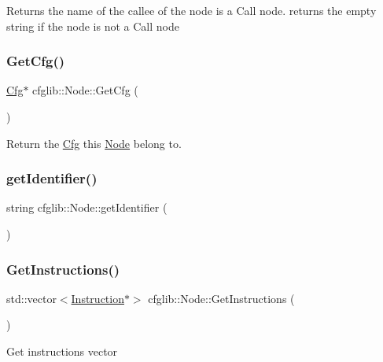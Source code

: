 Returns the name of the callee of the node is a Call node. returns the empty string if the node is not a Call node \mbox{\label{classcfglib_1_1Node_aba4169d7a66bceb6b5ae4e62193f669d}} 
\subsubsection{\texorpdfstring{Get\+Cfg()}{GetCfg()}}
{\footnotesize\ttfamily \hyperlink{classcfglib_1_1Cfg}{Cfg}$\ast$ cfglib\+::\+Node\+::\+Get\+Cfg (\begin{DoxyParamCaption}{ }\end{DoxyParamCaption})}

Return the \hyperlink{classcfglib_1_1Cfg}{Cfg} this \hyperlink{classcfglib_1_1Node}{Node} belong to. \mbox{\label{classcfglib_1_1Node_a42c979a43fa0e2314076fbecd3993514}} 
\subsubsection{\texorpdfstring{get\+Identifier()}{getIdentifier()}}
{\footnotesize\ttfamily string cfglib\+::\+Node\+::get\+Identifier (\begin{DoxyParamCaption}{ }\end{DoxyParamCaption})}

\mbox{\label{classcfglib_1_1Node_ad7e384556d7ab828b5e95536063668ad}} 
\subsubsection{\texorpdfstring{Get\+Instructions()}{GetInstructions()}}
{\footnotesize\ttfamily std\+::vector$<$\hyperlink{classcfglib_1_1Instruction}{Instruction}$\ast$$>$ cfglib\+::\+Node\+::\+Get\+Instructions (\begin{DoxyParamCaption}{ }\end{DoxyParamCaption})}

Get instructions vector \mbox{\label{classcfglib_1_1Node_a305a0c9ac27d6840536be1ccbcea29d3}} 
